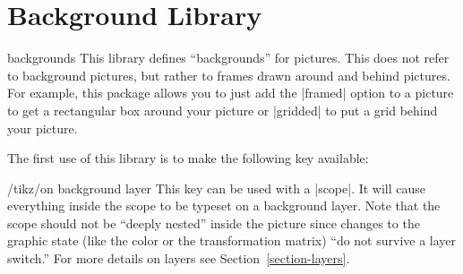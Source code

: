 %
%
%



\section{Background Library}

\label{section-tikz-backgrounds}

\begin{tikzlibrary}{backgrounds}
  This library defines ``backgrounds'' for pictures. This does not
  refer to background pictures, but rather to frames drawn around and
  behind pictures. For example, this package allows you to just add
  the |framed| option to a picture to get a rectangular box around
  your picture or |gridded| to put a grid behind your picture.
\end{tikzlibrary}


The first use of this library is to make the following key available: 
\begin{key}{/tikz/on background layer}
  This key can be used with a |{scope}|. It will cause everything
  inside the scope to be typeset on a background layer. Note that the
  scope should not be ``deeply nested'' inside the picture since
  changes to the graphic state (like the color or the transformation
  matrix) ``do not survive a layer switch.'' For more details on
  layers see Section~\ref{section-layers}.

\begin{codeexample}[]
\end{codeexample}
\end{key}


